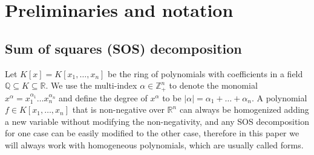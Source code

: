 \documentclass{amsart}
\theoremstyle{definition}
\theoremstyle{remark}
\numberwithin{equation}{section}
\newcommand{\Q}{{\mathbb Q}}
\newcommand{\R}{{\mathbb R}}
\newcommand{\Z}{{\mathbb Z}}
\begin{document}




\section{Preliminaries and notation}
\subsection{Sum of squares (SOS) decomposition }
Let $K[x] = K[x_1, \dots, x_n]$ be the ring of polynomials with coefficients in a field $\Q \subseteq K \subseteq \R$. We use the multi-index $\alpha \in \Z^n_+$ to denote the monomial $x^\alpha = x_1^{\alpha_1} \dots x_n^{\alpha_n}$ and define the degree of $x^\alpha$ to be $|\alpha| = \alpha_1 + \dots + \alpha_n$.  A polynomial $f \in K[x_1, \dots, x_n]$ that is non-negative over $\R^n$ can always be homogenized adding a new variable without modifying the non-negativity, and any SOS decomposition for one case can be easily modified to the other case, therefore in this paper we will always work with homogeneous polynomials, which are usually called forms.
\end{document}
